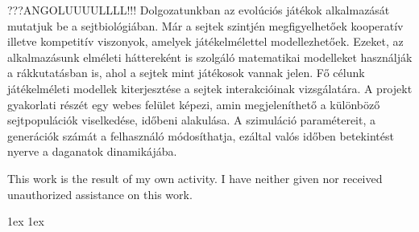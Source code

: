 \documentclass[final]{ubb_dolgozat}
\author{%
Kis Nándor
}
\renewcommand{\baselinestretch}{1.5}
\begin{document}
\begin{abstractEN} %



{	???ANGOLUUUULLLL!!!
	Dolgozatunkban az evolúciós játékok alkalmazását mutatjuk be a sejtbiológiában. Már a sejtek szintjén megfigyelhetőek kooperatív illetve kompetitív viszonyok, amelyek játékelmélettel modellezhetőek. Ezeket, az alkalmazásunk elméleti háttereként is szolgáló matematikai modelleket használják a rákkutatásban is, ahol a sejtek mint játékosok vannak jelen. Fő célunk játékelméleti modellek kiterjesztése a sejtek interakcióinak vizsgálatára. A projekt gyakorlati részét egy webes felület képezi, amin megjeleníthető a különböző sejtpopulációk viselkedése, időbeni alakulása. A szimuláció paramétereit, a generációk számát a felhasználó módosíthatja, ezáltal valós időben betekintést nyerve a daganatok dinamikájába.
}

This work is the result of my own activity. I have neither given nor received unauthorized assistance on this work.

\end{abstractEN}

\maketitle


{ \baselineskip 1ex
  \parskip 1ex
  \tableofcontents
}








{ \renewcommand{\baselinestretch}{0.8}\normalsize %
  \setlength{\itemsep}{-2.4mm}
  \setlength{\bibspacing}{0.67\baselineskip}
  
  
}
\end{document}
